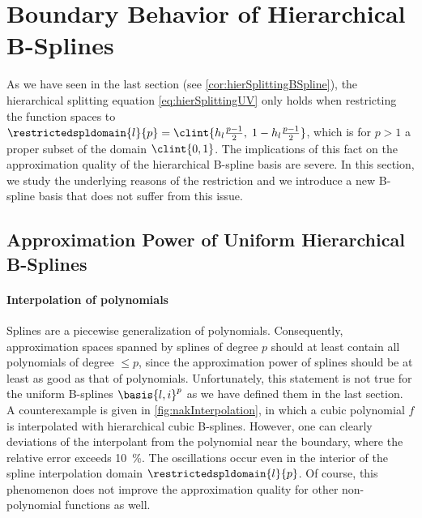 \section{Boundary Behavior of Hierarchical B-Splines}
\label{sec:32notAKnot}

As we have seen in the last section (see \cref{cor:hierSplittingBSpline}),
the hierarchical splitting equation \eqref{eq:hierSplittingUV}
only holds when restricting the function spaces to
$\restrictedspldomain{l}{p} = \clint{\ms{l} \tfrac{p-1}{2},\; 1 - \ms{l} \tfrac{p-1}{2}}$,
which is for $p > 1$ a proper subset of the domain $\clint{0, 1}$.
The implications of this fact on the approximation quality
of the hierarchical B-spline basis are severe.
In this section, we study the underlying reasons of the restriction and
we introduce a new B-spline basis that does not suffer from this issue.



\subsection{Approximation Power of Uniform Hierarchical B-Splines}
\label{sec:321approximation}


\paragraph{Interpolation of polynomials}

Splines are a piecewise generalization of polynomials.
Consequently, approximation spaces spanned by splines of degree $p$ should
at least contain all polynomials of degree $\le p$,
since the approximation power of splines should be at least as good
as that of polynomials.
Unfortunately, this statement is not true for the uniform B-splines
$\basis{l,i}^p$ as we have defined them in the last section.
A counterexample is given in \cref{fig:nakInterpolation},
in which a cubic polynomial $f$ is interpolated with
hierarchical cubic B-splines.
However, one can clearly deviations of the interpolant from the polynomial
near the boundary, where the relative error exceeds \SI{10}{\percent}.
The oscillations occur even in the interior of the
spline interpolation domain $\restrictedspldomain{l}{p}$.
Of course, this phenomenon does not improve the approximation quality
for other non-polynomial functions as well.

